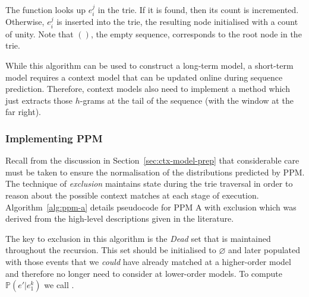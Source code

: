 \documentclass[12pt,a4paper,twoside,openright]{report}
\begin{document}
The function  looks up $e_i^j$ in the trie. If
it is found, then its count is incremented. Otherwise, $e_i^j$ is inserted into
the trie, the resulting node initialised with a count of unity. Note that $()$,
the empty sequence, corresponds to the root node in the trie.

While this algorithm can be used to construct a long-term model, a short-term
model requires a context model that can be updated online during sequence
prediction. Therefore, context models also need to implement a method which just
extracts those $h$-grams at the tail of the sequence (with the window at the far
right).

\subsubsection{Implementing PPM}

Recall from the discussion in Section~\ref{sec:ctx-model-prep} that considerable
care must be taken to ensure the normalisation of the distributions predicted by
PPM. The technique of \emph{exclusion} maintains state during the trie traversal
in order to reason about the possible context matches at each stage of
execution. Algorithm~\ref{alg:ppm-a} details pseudocode for PPM A with exclusion
which was derived from the high-level descriptions given in the literature.

The key to exclusion in this algorithm is the \textit{Dead} set that
is maintained throughout the recursion. This set should be initialised to
$\varnothing$ and later populated with those events that we \emph{could} have
already matched at a higher-order model and therefore no longer need to consider
at lower-order models. To compute $\mathbb{P}(e' | e_1^k)$ we call
.
\end{document}
